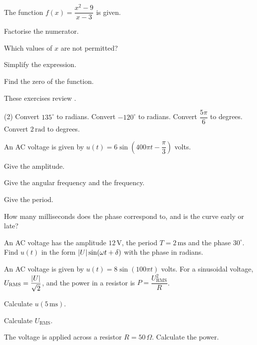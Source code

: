 The function $f(x) = \dfrac{x^2 - 9}{x - 3}$ is given.
\begin{parts}
  \item Factorise the numerator.
  \item Which values of $x$ are not permitted?
  \item Simplify the expression.
  \item Find the zero of the function.
\end{parts}

These exercises review .

\begin{delar}(2)
  \task Convert $135^{\circ}$ to radians.
  \task Convert $-120^{\circ}$ to radians.
  \task Convert $\dfrac{5\pi}{6}$ to degrees.
  \task Convert $2\,\text{rad}$ to degrees.
\end{delar}

An AC voltage is given by $u(t) = 6\sin\left(400\pi t - \dfrac{\pi}{3}\right)$ volts.
\begin{parts}
  \item Give the amplitude.
  \item Give the angular frequency and the frequency.
  \item Give the period.
  \item How many milliseconds does the phase correspond to, and is the curve early or late?
\end{parts}

An AC voltage has the amplitude $12\,\text{V}$, the period $T = 2\,\text{ms}$ and the phase
$30^{\circ}$. Find $u(t)$ in the form $\lvert U\rvert\sin(\omega t + \delta)$ with the phase in radians.

An AC voltage is given by $u(t) = 8\sin(100\pi t)$ volts. For a sinusoidal voltage,
$U_{\text{RMS}} = \dfrac{\lvert U\rvert}{\sqrt{2}}$, and the power in a resistor is $P = \dfrac{U_{\text{RMS}}^2}{R}$.
\begin{parts}
  \item Calculate $u(5\,\text{ms})$.
  \item Calculate $U_{\text{RMS}}$.
  \item The voltage is applied across a resistor $R = 50\,\Omega$. Calculate the power.
\end{parts}

